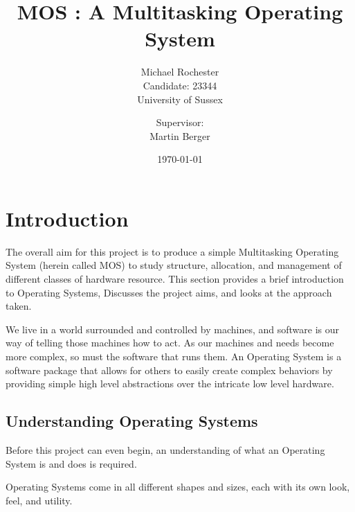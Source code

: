 \documentclass[a4paper]{report}
\title{MOS : A Multitasking Operating System}
\date{\today}
\author{Michael Rochester\\ Candidate: 23344\\ University of Sussex
        \and Supervisor:\\ Martin Berger}
\begin{document}
\titlespacing*{\chapter}{0pt}{-50pt}{20pt}
\titleformat{\chapter}[display]{\normalfont\huge\bfseries}{\chaptertitlename\ \thechapter}{20pt}{\Huge}


\maketitle

\tableofcontents
\listoffigures

\chapter{Introduction}

The overall aim for this project is to produce a simple Multitasking Operating System (herein called MOS) to study structure, allocation, and management of different classes of hardware resource. This section provides a brief introduction to Operating Systems, Discusses the project aims, and looks at the approach taken.

We live in a world surrounded and controlled by machines, and software is our way of telling those machines how to act. As our machines and needs become more complex, so must the software that runs them. An Operating System is a software package that allows for others to easily create complex behaviors by providing simple high level abstractions over the intricate low level hardware.


















\section{Understanding Operating Systems}


Before this project can even begin, an understanding of what an Operating System is and does is required.

Operating Systems come in all different shapes and sizes, each with its own look, feel, and utility.
\end{document}
